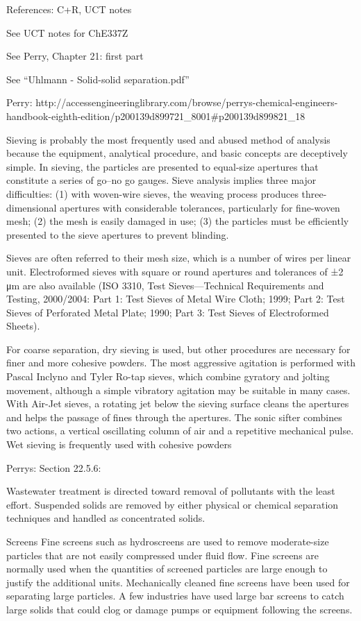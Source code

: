 References: C+R, UCT notes

See UCT notes for ChE337Z

See Perry, Chapter 21: first part

See ``Uhlmann - Solid-solid separation.pdf''

Perry: http://accessengineeringlibrary.com/browse/perrys-chemical-engineers-handbook-eighth-edition/p200139d899721_8001#p200139d899821_18

Sieving is probably the most frequently used and abused method of analysis because the equipment, analytical procedure, and basic concepts are deceptively simple. In sieving, the particles are presented to equal-size apertures that constitute a series of go–no go gauges. Sieve analysis implies three major difficulties: (1) with woven-wire sieves, the weaving process produces three-dimensional apertures with considerable tolerances, particularly for fine-woven mesh; (2) the mesh is easily damaged in use; (3) the particles must be efficiently presented to the sieve apertures to prevent blinding.

Sieves are often referred to their mesh size, which is a number of wires per linear unit. Electroformed sieves with square or round apertures and tolerances of ±2 μm are also available (ISO 3310, Test Sieves—Technical Requirements and Testing, 2000/2004: Part 1: Test Sieves of Metal Wire Cloth; 1999; Part 2: Test Sieves of Perforated Metal Plate; 1990; Part 3: Test Sieves of Electroformed Sheets).

For coarse separation, dry sieving is used, but other procedures are necessary for finer and more cohesive powders. The most aggressive agitation is performed with Pascal Inclyno and Tyler Ro-tap sieves, which combine gyratory and jolting movement, although a simple vibratory agitation may be suitable in many cases. With Air-Jet sieves, a rotating jet below the sieving surface cleans the apertures and helps the passage of fines through the apertures. The sonic sifter combines two actions, a vertical oscillating column of air and a repetitive mechanical pulse. Wet sieving is frequently used with cohesive powders

Perrys: Section 22.5.6:

Wastewater treatment is directed toward removal of pollutants with the least effort. Suspended solids are removed by either physical or chemical separation techniques and handled as concentrated solids.

Screens Fine screens such as hydroscreens are used to remove moderate-size particles that are not easily compressed under fluid flow. Fine screens are normally used when the quantities of screened particles are large enough to justify the additional units. Mechanically cleaned fine screens have been used for separating large particles. A few industries have used large bar screens to catch large solids that could clog or damage pumps or equipment following the screens.

